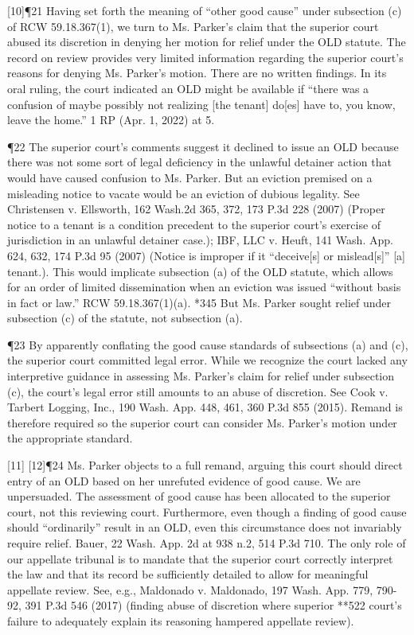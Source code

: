 \documentclass[11pt]{article}
\begin{document}
[10]¶21 Having set forth the meaning of “other good cause” under subsection (c) of RCW 59.18.367(1), we turn to Ms. Parker’s claim that the superior court abused its discretion in denying her motion for relief under the OLD statute. The record on review provides very limited information regarding the superior court’s reasons for denying Ms. Parker’s motion. There are no written findings. In its oral ruling, the court indicated an OLD might be available if “there was a confusion of maybe possibly not realizing [the tenant] do[es] have to, you know, leave the home.” 1 RP (Apr. 1, 2022) at 5.

¶22 The superior court’s comments suggest it declined to issue an OLD because there was not some sort of legal deficiency in the unlawful detainer action that would have caused confusion to Ms. Parker. But an eviction premised on a misleading notice to vacate would be an eviction of dubious legality. See Christensen v. Ellsworth, 162 Wash.2d 365, 372, 173 P.3d 228 (2007) (Proper notice to a tenant is a condition precedent to the superior court’s exercise of jurisdiction in an unlawful detainer case.); IBF, LLC v. Heuft, 141 Wash. App. 624, 632, 174 P.3d 95 (2007) (Notice is improper if it “deceive[s] or mislead[s]” [a] tenant.). This would implicate subsection (a) of the OLD statute, which allows for an order of limited dissemination when an eviction was issued “without basis in fact or law.” RCW 59.18.367(1)(a). *345 But Ms. Parker sought relief under subsection (c) of the statute, not subsection (a).

¶23 By apparently conflating the good cause standards of subsections (a) and (c), the superior court committed legal error. While we recognize the court lacked any interpretive guidance in assessing Ms. Parker’s claim for relief under subsection (c), the court’s legal error still amounts to an abuse of discretion. See Cook v. Tarbert Logging, Inc., 190 Wash. App. 448, 461, 360 P.3d 855 (2015). Remand is therefore required so the superior court can consider Ms. Parker’s motion under the appropriate standard.

[11] [12]¶24 Ms. Parker objects to a full remand, arguing this court should direct entry of an OLD based on her unrefuted evidence of good cause. We are unpersuaded. The assessment of good cause has been allocated to the superior court, not this reviewing court. Furthermore, even though a finding of good cause should “ordinarily” result in an OLD, even this circumstance does not invariably require relief. Bauer, 22 Wash. App. 2d at 938 n.2, 514 P.3d 710. The only role of our appellate tribunal is to mandate that the superior court correctly interpret the law and that its record be sufficiently detailed to allow for meaningful appellate review. See, e.g., Maldonado v. Maldonado, 197 Wash. App. 779, 790-92, 391 P.3d 546 (2017) (finding abuse of discretion where superior **522 court’s failure to adequately explain its reasoning hampered appellate review).
\end{document}
